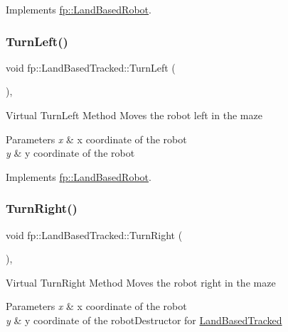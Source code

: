 Implements \hyperlink{classfp_1_1_land_based_robot_a370d28ef28553e8e7a56b1ea68884bb0}{fp\+::\+Land\+Based\+Robot}.

\mbox{\label{classfp_1_1_land_based_tracked_a63141c32f8f81c301be4126297103a41}} 
\subsubsection{\texorpdfstring{Turn\+Left()}{TurnLeft()}}
{\footnotesize\ttfamily void fp\+::\+Land\+Based\+Tracked\+::\+Turn\+Left (\begin{DoxyParamCaption}{ }\end{DoxyParamCaption})\hspace{0.3cm}{\ttfamily [override]}, {\ttfamily [virtual]}}

Virtual Turn\+Left Method Moves the robot left in the maze 
\begin{DoxyParams}{Parameters}
{\em x} & x coordinate of the robot \\
\hline
{\em y} & y coordinate of the robot \\
\hline
\end{DoxyParams}


Implements \hyperlink{classfp_1_1_land_based_robot_acd135f01e40d4f2e32739156b56c722f}{fp\+::\+Land\+Based\+Robot}.

\mbox{\label{classfp_1_1_land_based_tracked_a813613a1eaa7a0782ea254a167d97da3}} 
\subsubsection{\texorpdfstring{Turn\+Right()}{TurnRight()}}
{\footnotesize\ttfamily void fp\+::\+Land\+Based\+Tracked\+::\+Turn\+Right (\begin{DoxyParamCaption}{ }\end{DoxyParamCaption})\hspace{0.3cm}{\ttfamily [override]}, {\ttfamily [virtual]}}

Virtual Turn\+Right Method Moves the robot right in the maze 
\begin{DoxyParams}{Parameters}
{\em x} & x coordinate of the robot \\
\hline
{\em y} & y coordinate of the robot\+Destructor for \hyperlink{classfp_1_1_land_based_tracked}{Land\+Based\+Tracked} \\
\hline
\end{DoxyParams}


